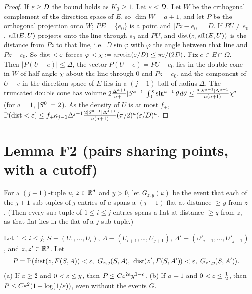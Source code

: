 \documentclass[11pt]{article}
\begin{document}
\begin{proof}
If $\varepsilon\ge D$ the bound holds as $K_0\ge1$. Let $\varepsilon<D$. Let $W$ be the orthogonal complement of the direction space of
$E$, so $\dim W=a+1$, and let $P$ be the orthogonal projection onto $W$; $PE=\{e_0\}$ is a point and $|Pz-e_0|=D$. If $PU\ne e_0$,
$\operatorname{aff}(E,U)$ projects onto the line through $e_0$ and $PU$, and $\operatorname{dist}(z,\operatorname{aff}(E,U))$ is the distance from $Pz$ to that line,
i.e.\ $D\sin\varphi$ with $\varphi$ the angle between that line and $Pz-e_0$. So $\operatorname{dist}<\varepsilon$ forces
$\varphi<\chi:=\arcsin(\varepsilon/D)\le\pi\varepsilon/(2D)$. Fix $e\in E\cap\Omega$. Then $|P(U-e)|\le\Delta$, the vector $P(U-e)=PU-e_0$ lies in the
double cone in $W$ of half-angle $\chi$ about the line through $0$ and $Pz-e_0$, and the component of $U-e$ in the direction
space of $E$ lies in a $(j-1)$-ball of radius $\Delta$. The truncated double cone has volume
$2\frac{\Delta^{a+1}}{a+1}|S^{a-1}|\int_0^\chi\sin^{a-1}\theta\,d\theta\le\frac{2|S^{a-1}|\Delta^{a+1}}{a(a+1)}\chi^a$ (for $a=1$,
$|S^0|=2$). As the density of $U$ is at most $f_+$,
$\mathbb{P}(\operatorname{dist}<\varepsilon)\le f_+\kappa_{j-1}\Delta^{j-1}\frac{2|S^{a-1}|\Delta^{a+1}}{a(a+1)}(\pi/2)^a(\varepsilon/D)^a$.
\end{proof}

\section*{Lemma F2 (pairs sharing points, with a cutoff)}

For a $(j+1)$-tuple $u$, $z\in\mathbb{R}^d$ and $y>0$, let $G_{z,y}(u)$ be the event that each of the $j+1$ sub-tuples of $j$
entries of $u$ spans a $(j-1)$-flat at distance $\ge y$ from $z$. (Then every sub-tuple of $1\le i\le j$ entries spans a flat at
distance $\ge y$ from $z$, as that flat lies in the flat of a $j$-sub-tuple.)

\begin{lemma}\label{F2}
Let $1\le i\le j$, $S=(U_1,\dots,U_i)$, $A=(U_{i+1},\dots,U_{j+1})$, $A'=(U'_{i+1},\dots,U'_{j+1})$, and $z,z'\in\mathbb{R}^d$. Let
\[
  P=\Pr\bigl(\dist(z,F(S,A))<\eps,\ G_{z,y}(S,A),\ \dist(z',F(S,A'))<\eps,\ G_{z',y}(S,A')\bigr).
\]
(a) If $a\ge2$ and $0<\varepsilon\le y$, then $P\le C\varepsilon^{2a}y^{1-a}$.
(b) If $a=1$ and $0<\varepsilon\le\frac12$, then $P\le C\varepsilon^2(1+\log(1/\varepsilon))$, even without the events $G$.
\end{lemma}
\end{document}
